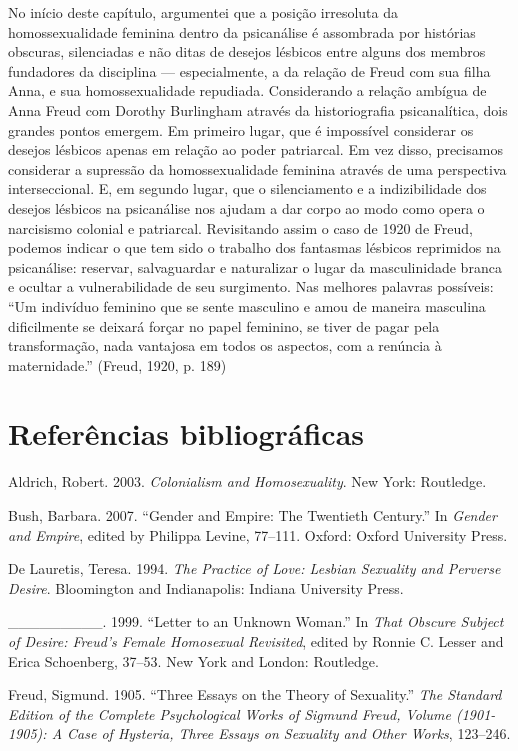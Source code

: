 No início deste capítulo, argumentei que a posição irresoluta da
homossexualidade feminina dentro da psicanálise é assombrada por
histórias obscuras, silenciadas e não ditas de desejos lésbicos entre
alguns dos membros fundadores da disciplina --- especialmente, a da
relação de Freud com sua filha Anna, e sua homossexualidade repudiada.
Considerando a relação ambígua de Anna Freud com Dorothy Burlingham
através da historiografia psicanalítica, dois grandes pontos emergem. Em
primeiro lugar, que é impossível considerar os desejos lésbicos apenas
em relação ao poder patriarcal. Em vez disso, precisamos considerar a
supressão da homossexualidade feminina através de uma perspectiva
interseccional. E, em segundo lugar, que o silenciamento e a
indizibilidade dos desejos lésbicos na psicanálise nos ajudam a dar
corpo ao modo como opera o narcisismo colonial e patriarcal. Revisitando
assim o caso de 1920 de Freud, podemos indicar o que tem sido o trabalho
dos fantasmas lésbicos reprimidos na psicanálise: reservar, salvaguardar
e naturalizar o lugar da masculinidade branca e ocultar a
vulnerabilidade de seu surgimento. Nas melhores palavras possíveis: ``Um
indivíduo feminino que se sente masculino e amou de maneira masculina
dificilmente se deixará forçar no papel feminino, se tiver de pagar pela
transformação, nada vantajosa em todos os aspectos, com a renúncia à
maternidade.'' (Freud, 1920, p. 189)

\section{Referências bibliográficas}

Aldrich, Robert. 2003. \emph{Colonialism and Homosexuality}. New York:
Routledge.

Bush, Barbara. 2007. ``Gender and Empire: The Twentieth Century.'' In
\emph{Gender and Empire}, edited by Philippa Levine, 77--111. Oxford:
Oxford University Press.

De Lauretis, Teresa. 1994. \emph{The Practice of Love: Lesbian Sexuality
and Perverse Desire}. Bloomington and Indianapolis: Indiana University
Press.

\_\_\_\_\_\_\_\_\_. 1999. ``Letter to an Unknown Woman.'' In \emph{That Obscure
Subject of Desire: Freud's Female Homosexual Revisited}, edited by
Ronnie C. Lesser and Erica Schoenberg, 37--53. New York and London:
Routledge.

Freud, Sigmund. 1905. ``Three Essays on the Theory of Sexuality.''
\emph{The Standard Edition of the Complete Psychological Works of
Sigmund Freud, Volume  (1901-1905): A Case of Hysteria, Three Essays
on Sexuality and Other Works}, 123--246.

